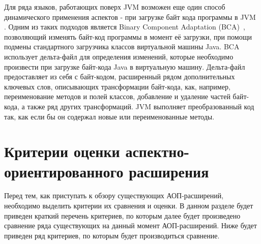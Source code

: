 Для ряда языков, работающих поверх JVM возможен еще один способ динамического
применения аспектов - при загрузке байт кода программы в JVM~
\cite{aspect_dynamic_weavers_in_oop}.
Одним из таких подходов является Binary Component Adaptation (BCA)~\cite{bca},
позволяющий изменять байт-код программы в момент её загрузки, при помощи
подмены стандартного загрузчика классов виртуальной машины Java.
BCA использует дельта-файл для определения изменений, которые необходимо
произвести при загрузке байт-кода Java в виртуальную машину.
Дельта-файл предоставляет из себя с байт-кодом, расширенный рядом дополнительных
ключевых слов, описывающих трансформации байт-кода, как, например,
переименование методов и полей классов, добавление и удаление частей байт-кода,
а также ряд других трансформаций.
JVM выполняет преобразованный код так, как если бы он содержал новые или
переименованные методы.


\section{Критерии оценки аспектно-ориентированного расширения}
\label{sec:aop_extension_criteria}
Перед тем, как приступать к обзору существующих АОП-расширений, необходимо
выделить критерии их сравнения и оценки.
В данном разделе будет приведен краткий перечень критериев, по которым далее
будет произведено сравнение ряда существующих на данный момент АОП-расширений.
Ниже будет приведен ряд критериев, по которым будет производиться сравнение.

